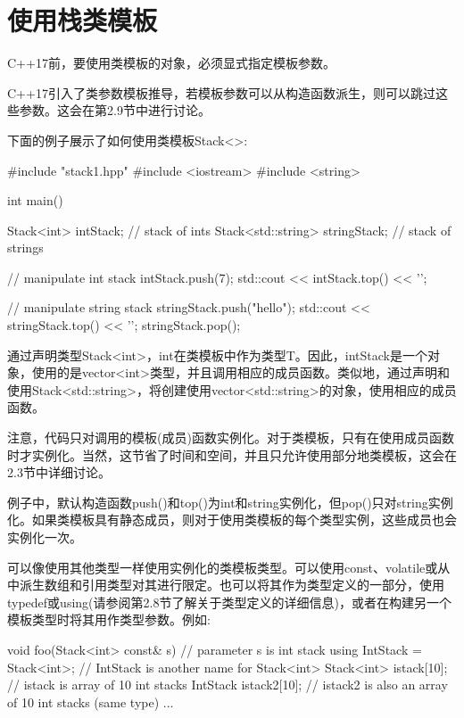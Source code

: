 \section{使用栈类模板}

C++17前，要使用类模板的对象，必须显式指定模板参数。

\begin{notice}
C++17引入了类参数模板推导，若模板参数可以从构造函数派生，则可以跳过这些参数。这会在第2.9节中进行讨论。
\end{notice}

下面的例子展示了如何使用类模板Stack<>:

\begin{cpp}
#include "stack1.hpp"
#include <iostream>
#include <string>

int main()
{
	Stack<int> intStack; // stack of ints
	Stack<std::string> stringStack; // stack of strings
	
	// manipulate int stack
	intStack.push(7);
	std::cout << intStack.top() << '\n';
	
	// manipulate string stack
	stringStack.push("hello");
	std::cout << stringStack.top() << '\n';
	stringStack.pop();
}
\end{cpp}

通过声明类型Stack<int>，int在类模板中作为类型T。因此，intStack是一个对象，使用的是vector<int>类型，并且调用相应的成员函数。类似地，通过声明和使用Stack<std::string>，将创建使用vector<std::string>的对象，使用相应的成员函数。

注意，代码只对调用的模板(成员)函数实例化。对于类模板，只有在使用成员函数时才实例化。当然，这节省了时间和空间，并且只允许使用部分地类模板，这会在2.3节中详细讨论。

例子中，默认构造函数push()和top()为int和string实例化，但pop()只对string实例化。如果类模板具有静态成员，则对于使用类模板的每个类型实例，这些成员也会实例化一次。

可以像使用其他类型一样使用实例化的类模板类型。可以使用const、volatile或从中派生数组和引用类型对其进行限定。也可以将其作为类型定义的一部分，使用typedef或using(请参阅第2.8节了解关于类型定义的详细信息)，或者在构建另一个模板类型时将其用作类型参数。例如:

\begin{cpp}
void foo(Stack<int> const& s) // parameter s is int stack
{
	using IntStack = Stack<int>; // IntStack is another name for Stack<int>
	Stack<int> istack[10]; // istack is array of 10 int stacks
	IntStack istack2[10]; // istack2 is also an array of 10 int stacks (same type)
	...
}
\end{cpp}

